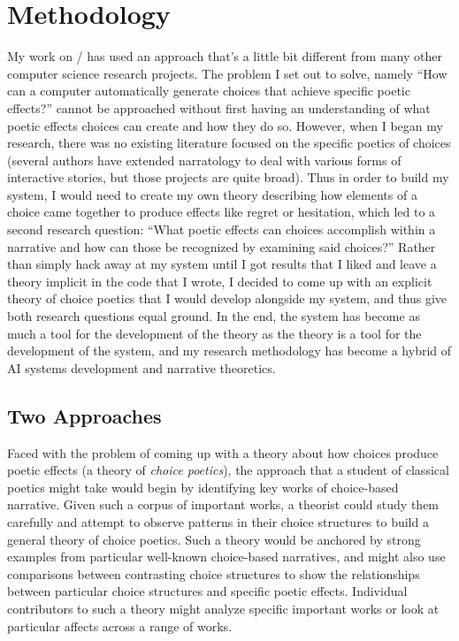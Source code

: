 \chapter{Methodology}

\label{ch:method}

My work on \dunyazad/ has used an approach that's a little bit different from many other computer science research projects.
%
The problem I set out to solve, namely ``How can a computer automatically generate choices that achieve specific poetic effects?'' cannot be approached without first having an understanding of what poetic effects choices can create and how they do so.
%
However, when I began my research, there was no existing literature focused on the specific poetics of choices (several authors have extended narratology to deal with various forms of interactive stories, but those projects are quite broad).
%
Thus in order to build my system, I would need to create my own theory describing how elements of a choice came together to produce effects like regret or hesitation, which led to a second research question: ``What poetic effects can choices accomplish within a narrative and how can those be recognized by examining said choices?''
%
Rather than simply hack away at  my system until I got results that I liked and leave a theory implicit in the code that I wrote, I decided to come up with an explicit theory of choice poetics that I would develop alongside my system, and thus give both research questions equal ground.
%
In the end, the system has become as much a tool for the development of the theory as the theory is a tool for the development of the system, and my research methodology has become a hybrid of AI systems development and narrative theoretics.


\section{Two Approaches}

Faced with the problem of coming up with a theory about how choices produce poetic effects (a theory of \emph{choice poetics}), the approach that a student of classical poetics might take would begin by identifying key works of choice-based narrative.
%
Given such a corpus of important works, a theorist could study them carefully and attempt to observe patterns in their choice structures to build a general theory of choice poetics.
%
Such a theory would be anchored by strong examples from particular well-known choice-based narratives, and might also use comparisons between contrasting choice structures to show the relationships between particular choice structures and specific poetic effects.
%
Individual contributors to such a theory might analyze specific important works or look at particular affects across a range of works.


